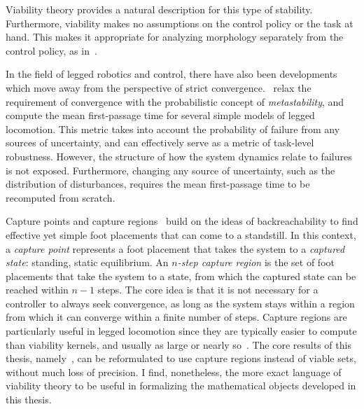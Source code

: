 Viability theory provides a natural description for this type of stability. Furthermore, viability makes no assumptions on the control policy or the task at hand. This makes it appropriate for analyzing morphology separately from the control policy, as in~\cite{heim2019beyond}. \par

In the field of legged robotics and control, there have also been developments which move away from the perspective of strict convergence.~\textcite{byl2009metastable} relax the requirement of convergence with the probabilistic concept of \emph{metastability}, and compute the mean first-passage time for several simple models of legged locomotion. This metric takes into account the probability of failure from any sources of uncertainty, and can effectively serve as a metric of task-level robustness.
However, the structure of how the system dynamics relate to failures is not exposed. Furthermore, changing any source of uncertainty, such as the distribution of disturbances, requires the mean first-passage time to be recomputed from scratch. \par

Capture points and capture regions~\cite{koolen2012capturability} build on the ideas of backreachability to find effective yet simple foot placements that can come to a standstill. In this context, a \emph{capture point} represents a foot placement that takes the system to a \emph{captured state}: standing, static equilibrium. An \emph{$n$-step capture region} is the set of foot placements that take the system to a state, from which the captured state can be reached within $n-1$ steps.
The core idea is that it is not necessary for a controller to always seek convergence, as long as the system stays within a region from which it can converge within a finite number of steps.
Capture regions are particularly useful in legged locomotion since they are typically easier to compute than viability kernels, and usually as large or nearly so~\cite{koolen2012capturability,zaytsev2018boundaries}. The core results of this thesis, namely~\cite{heim2019beyond,heim2019learnable}, can be reformulated to use capture regions instead of viable sets, without much loss of precision. I find, nonetheless, the more exact language of viability theory to be useful in formalizing the mathematical objects developed in this thesis. \par

